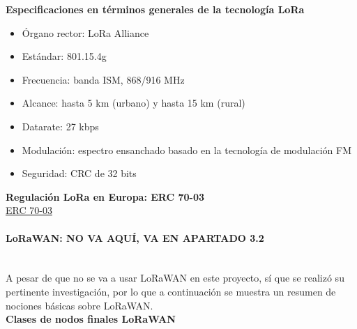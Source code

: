 \documentclass[12pt]{article}
\newcommand{\subsubsubsection}[1]{\paragraph{#1}\mbox{}\\}
\begin{document}
	\noindent \textbf{Especificaciones en términos generales de la tecnología LoRa}
	
	\begin{itemize}
		\item Órgano rector: LoRa Alliance
		\item Estándar: 801.15.4g
		\item Frecuencia: banda ISM, 868/916 MHz
		\item Alcance: hasta 5 km (urbano) y hasta 15 km (rural)
		\item Datarate: 27 kbps
		\item Modulación: espectro ensanchado basado en la tecnología de modulación FM
		\item Seguridad: CRC de 32 bits
	\end{itemize}
	 
	 
	
	\noindent  \textbf{Regulación LoRa en Europa: ERC 70-03} \\
	
	\noindent \href{https://docdb.cept.org/download/25c41779-cd6e/Rec7003e.pdf}{ERC 70-03} \\
	
	
	\pagebreak
	
	\subsubsubsection{LoRaWAN: NO VA AQUÍ, VA EN APARTADO 3.2}
	
	\noindent A pesar de que no se va a usar LoRaWAN en este proyecto, sí que se realizó su pertinente investigación, por lo que a continuación se muestra un resumen de nociones básicas sobre LoRaWAN. \\
	
	\noindent \textbf{Clases de nodos finales LoRaWAN}  \\
	
\end{document}
